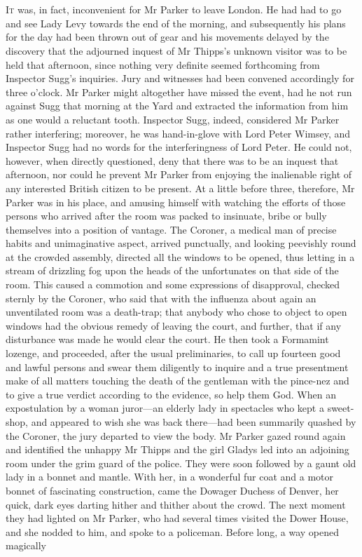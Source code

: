 \chapter[Chapter \thechapter]{}
\lettrine[lines=4]{I}{t} was, in fact, inconvenient for Mr Parker to leave London. He had had to go and see Lady Levy towards the end of the morning, and subsequently his plans for the day had been thrown out of gear and his movements delayed by the discovery that the adjourned inquest of Mr Thipps's unknown visitor was to be held that afternoon, since nothing very definite seemed forthcoming from Inspector Sugg's inquiries. Jury and witnesses had been convened accordingly for three o'clock. Mr Parker might altogether have missed the event, had he not run against Sugg that morning at the Yard and extracted the information from him as one would a reluctant tooth. Inspector Sugg, indeed, considered Mr Parker rather interfering; moreover, he was hand-in-glove with Lord Peter Wimsey, and Inspector Sugg had no words for the interferingness of Lord Peter. He could not, however, when directly questioned, deny that there was to be an inquest that afternoon, nor could he prevent Mr Parker from enjoying the inalienable right of any interested British citizen to be present. At a little before three, therefore, Mr Parker was in his place, and amusing himself with watching the efforts of those persons who arrived after the room was packed to insinuate, bribe or bully themselves into a position of vantage. The Coroner, a medical man of precise habits and unimaginative aspect, arrived punctually, and looking peevishly round at the crowded assembly, directed all the windows to be opened, thus letting in a stream of drizzling fog upon the heads of the unfortunates on that side of the room. This caused a commotion and some expressions of disapproval, checked sternly by the Coroner, who said that with the influenza about again an unventilated room was a death-trap; that anybody who chose to object to open windows had the obvious remedy of leaving the court, and further, that if any disturbance was made he would clear the court. He then took a Formamint lozenge, and proceeded, after the usual preliminaries, to call up fourteen good and lawful persons and swear them diligently to inquire and a true presentment make of all matters touching the death of the gentleman with the pince-nez and to give a true verdict according to the evidence, so help them God. When an expostulation by a woman juror—an elderly lady in spectacles who kept a sweet-shop, and appeared to wish she was back there—had been summarily quashed by the Coroner, the jury departed to view the body. Mr Parker gazed round again and identified the unhappy Mr Thipps and the girl Gladys led into an adjoining room under the grim guard of the police. They were soon followed by a gaunt old lady in a bonnet and mantle. With her, in a wonderful fur coat and a motor bonnet of fascinating construction, came the Dowager Duchess of Denver, her quick, dark eyes darting hither and thither about the crowd. The next moment they had lighted on Mr Parker, who had several times visited the Dower House, and she nodded to him, and spoke to a policeman. Before long, a way opened magically 